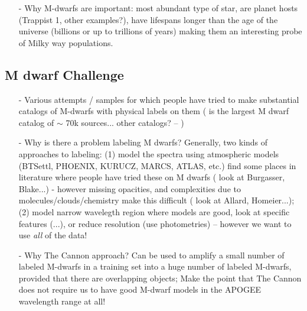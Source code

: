 \documentclass[modern]{aastex62}
\begin{document}
\begin{enumerate}
\item[-] Why M-dwarfs are important: most abundant type of star, are planet hosts (Trappist 1, other examples?), have lifespans longer than the age of the universe (billions or up to trillions of years) making them an interesting probe of Milky way populations. \color{red}{Need citations!}
\end{enumerate}

\subsection{M dwarf Challenge}
\begin{enumerate}
\item[-] Various attempts / samples for which people have tried to make substantial catalogs of M-dwarfs with physical labels on them (\citealt{West:2011} is the largest M dwarf catalog of $\sim$ 70k sources... other catalogs? -- \color{red}{Need citations!}\color{black}) 

\item[-] Why is there a problem labeling M dwarfs? Generally, two kinds of approaches to labeling: (1) model the spectra using atmospheric models (BTSettl, PHOENIX, KURUCZ, MARCS, ATLAS, etc.) find some places in literature where people have tried these on M dwarfs (\color{red}{Need citations... }\color{black} look at Burgasser, Blake...) - however missing opacities, and complexities due to molecules/clouds/chemistry make this difficult (\color{red}{Need citations... }\color{black} look at Allard, Homeier...); (2) model narrow wavelegth region where models are good, look at specific features (\citealt{Rojas-Ayala:2012}...), or reduce resolution (use photometries) -- however we want to use \emph{all} of the data!


\item[-] Why The Cannon approach? Can be used to amplify a small number of labeled M-dwarfs in a training set into a huge number of labeled M-dwarfs, provided that there are overlapping objects; Make the point that The Cannon does not require us to have good M-dwarf models in the APOGEE wavelength range at all!

\end{enumerate}
\end{document}
